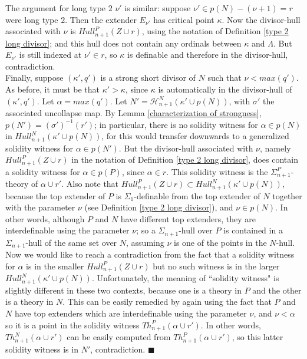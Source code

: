 \documentclass[12pt]{article}
\begin{document}
The argument for long type $2$ $\nu'$ is similar: suppose $\nu' \in p(N) - ( \nu + 1 ) = r$ were long type $2$.  Then the extender $E_{\nu'}$ has critical point $\kappa$.  Now the divisor-hull associated with $\nu$ is $Hull^P_{n+1} (Z \cup r )$, using the notation of Definition \ref{type 2 long divisor}; and this hull does not contain any ordinals between $\kappa$ and $\Lambda$.  But $E_{\nu'}$ is still indexed at $\nu' \in r$, so $\kappa$ is definable and therefore in the divisor-hull, contradiction.\\

Finally, suppose $( \kappa' , q' )$ is a strong short divisor of $N$ such that $\nu < max( q')$.  As before, it must be that $\kappa' > \kappa$, since $\kappa$ is automatically in the divisor-hull of $( \kappa' , q' )$.  Let $\alpha = max(q')$.  Let $N' = \mathcal{H}_{n+1}^N ( \kappa' \cup p(N))$, with $\sigma'$ the associated uncollapse map.  By Lemma \ref{characterization of strongness}, $p (N') = (\sigma')^{-1} (r')$; in particular, there is no solidity witness for $\alpha \in p(N)$ in $Hull_{n+1}^N ( \kappa' \cup p(N))$, for this would transfer downwards to a generalized solidity witness for $\alpha \in p(N')$.  But the divisor-hull associated with $\nu$, namely $Hull^P_{n+1} (Z \cup r )$ in the notation of Definition \ref{type 2 long divisor}, does contain a solidity witness for $\alpha \in p(P)$, since $\alpha \in r$.  This solidity witness is the $\Sigma_{n+1}^P$-theory of $\alpha \cup r'$.  Also note that $Hull^P_{n+1} (Z \cup r ) \subset Hull_{n+1}^N ( \kappa' \cup p(N))$, because the top extender of $P$ is $\Sigma_1$-definable from the top extender of $N$ together with the parameter $\nu$ (see Definition \ref{type 2 long divisor}), and $\nu \in p(N)$.  In other words, although $P$ and $N$ have different top extenders, they are interdefinable using the parameter $\nu$; so a $\Sigma_{n+1}$-hull over $P$ is contained in a $\Sigma_{n+1}$-hull of the same set over $N$, assuming $\nu$ is one of the points in the $N$-hull.  Now we would like to reach a contradiction from the fact that a solidity witness for $\alpha$ is in the smaller $Hull^P_{n+1} (Z \cup r )$ but no such witness is in the larger $Hull_{n+1}^N ( \kappa' \cup p(N))$.  Unfortunately, the meaning of ``solidity witness" is slightly different in these two contexts, because one is a theory in $P$ and the other is a theory in $N$.  This can be easily remedied by again using the fact that $P$ and $N$ have top extenders which are interdefinable using the parameter $\nu$, and $\nu < \alpha$ so it is a point in the solidity witness $Th_{n+1}^P ( \alpha \cup r')$.  In other words, $Th_{n+1}^N ( \alpha \cup r')$ can be easily computed from $Th_{n+1}^P ( \alpha \cup r' )$, so this latter solidity witness is in $N'$, contradiction. $\blacksquare$\\
\end{document}
